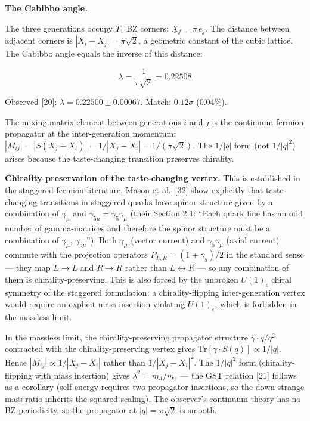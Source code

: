 \documentclass[
]{article}
\begin{document}
\textbf{The Cabibbo angle.}

The three generations occupy \(T_1\) BZ corners: \(X_j = \pi\,e_j\). The
distance between adjacent corners is \(|X_i - X_j| = \pi\sqrt{2}\), a
geometric constant of the cubic lattice. The Cabibbo angle equals the
inverse of this distance:

\[\boxed{\lambda = \frac{1}{\pi\sqrt{2}} = 0.22508}\]

Observed {[}20{]}: \(\lambda = 0.22500 \pm 0.00067\). Match:
\(0.12\sigma\) (\(0.04\%\)).

The mixing matrix element between generations \(i\) and \(j\) is the
continuum fermion propagator at the inter-generation momentum:
\(|M_{ij}| = |S(X_j - X_i)| = 1/|X_j - X_i| = 1/(\pi\sqrt{2})\). The
\(1/|q|\) form (not \(1/|q|^2\)) arises because the taste-changing
transition preserves chirality.

\textbf{Chirality preservation of the taste-changing vertex.} This is
established in the staggered fermion literature. Mason et al.~{[}32{]}
show explicitly that taste-changing transitions in staggered quarks have
spinor structure given by a combination of \(\gamma_\mu\) and
\(\gamma_{5\mu} = \gamma_5\gamma_\mu\) (their Section 2.1: ``Each quark
line has an odd number of gamma-matrices and therefore the spinor
structure must be a combination of \(\gamma_\mu\), \(\gamma_{5\mu}\)'').
Both \(\gamma_\mu\) (vector current) and \(\gamma_5\gamma_\mu\) (axial
current) commute with the projection operators
\(P_{L,R} = (1 \mp \gamma_5)/2\) in the standard sense --- they map
\(L \to L\) and \(R \to R\) rather than \(L \leftrightarrow R\) --- so
any combination of them is chirality-preserving. This is also forced by
the unbroken \(U(1)_\epsilon\) chiral symmetry of the staggered
formulation: a chirality-flipping inter-generation vertex would require
an explicit mass insertion violating \(U(1)_\epsilon\), which is
forbidden in the massless limit.

In the massless limit, the chirality-preserving propagator structure
\(\gamma \cdot q / q^2\) contracted with the chirality-preserving vertex
gives \(\text{Tr}[\gamma \cdot S(q)] \propto 1/|q|\). Hence
\(|M_{ij}| \propto 1/|X_j - X_i|\) rather than \(1/|X_j - X_i|^2\). The
\(1/|q|^2\) form (chirality-flipping with mass insertion) gives
\(\lambda^2 = m_d/m_s\) --- the GST relation {[}21{]} follows as a
corollary (self-energy requires two propagator insertions, so the
down-strange mass ratio inherits the squared scaling). The observer's
continuum theory has no BZ periodicity, so the propagator at
\(|q| = \pi\sqrt{2}\) is smooth.
\end{document}
